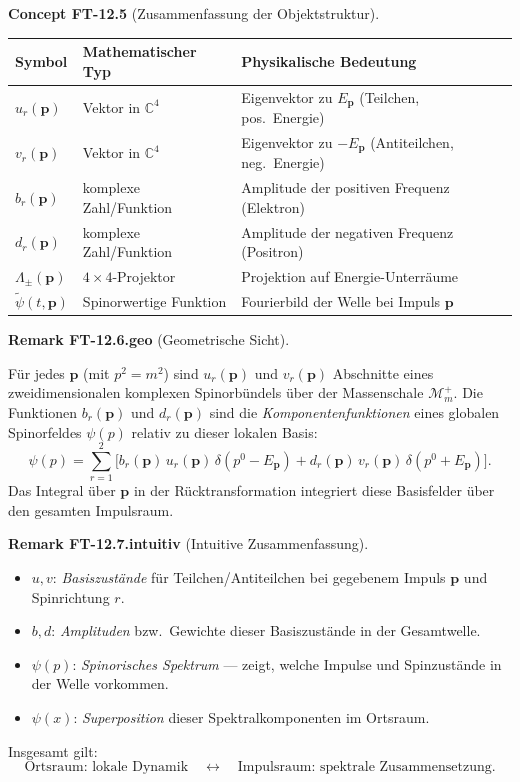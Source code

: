 \documentclass[10pt, letterpaper]{article}
\newcommand{\C}{\mathbb{C}}
\newcommand{\CustomHeading}[3]{%
  \par\medskip\noindent%
  \textbf{#1 #2} \textnormal{(#3)}.\enskip%
}
\newenvironment{REM}[2]{\begin{unitbox}\CustomHeading{Remark}{#1}{#2}}{\end{unitbox}}
\newenvironment{CONC}[2]{\begin{unitbox}\CustomHeading{Concept}{#1}{#2}}{\end{unitbox}}
\begin{document}
\begin{CONC}{FT-12.5}{Zusammenfassung der Objektstruktur}
\begin{center}
\begin{tabular}{lll}
\hline
Symbol & Mathematischer Typ & Physikalische Bedeutung\\
\hline
$u_r(\mathbf p)$ & Vektor in $\C^4$ & Eigenvektor zu $E_{\mathbf p}$ (Teilchen, pos.\ Energie)\\
$v_r(\mathbf p)$ & Vektor in $\C^4$ & Eigenvektor zu $-E_{\mathbf p}$ (Antiteilchen, neg.\ Energie)\\
$b_r(\mathbf p)$ & komplexe Zahl/Funktion & Amplitude der positiven Frequenz (Elektron)\\
$d_r(\mathbf p)$ & komplexe Zahl/Funktion & Amplitude der negativen Frequenz (Positron)\\
$\Lambda_\pm(\mathbf p)$ & $4\times4$-Projektor & Projektion auf Energie-Unterräume\\
$\tilde\psi(t,\mathbf p)$ & Spinorwertige Funktion & Fourierbild der Welle bei Impuls $\mathbf p$\\
\hline
\end{tabular}
\end{center}
\end{CONC}

\begin{REM}{FT-12.6.geo}{Geometrische Sicht}
Für jedes $\mathbf p$ (mit $p^2=m^2$) sind $u_r(\mathbf p)$ und $v_r(\mathbf p)$ Abschnitte eines zweidimensionalen komplexen Spinorbündels über der Massenschale $\mathcal M_m^+$.  
Die Funktionen $b_r(\mathbf p)$ und $d_r(\mathbf p)$ sind die \emph{Komponentenfunktionen} eines globalen Spinorfeldes $\psi(p)$ relativ zu dieser lokalen Basis:
\[
 \psi(p)=\sum_{r=1}^2 \Big[ b_r(\mathbf p)\,u_r(\mathbf p)\,\delta(p^0-E_{\mathbf p})
 + d_r(\mathbf p)\,v_r(\mathbf p)\,\delta(p^0+E_{\mathbf p})\Big].
\]
Das Integral über $\mathbf p$ in der Rücktransformation integriert diese Basisfelder über den gesamten Impulsraum.
\end{REM}

\begin{REM}{FT-12.7.intuitiv}{Intuitive Zusammenfassung}
\begin{itemize}
\item $u,v$: \emph{Basiszustände} für Teilchen/Antiteilchen bei gegebenem Impuls $\mathbf p$ und Spinrichtung $r$.
\item $b,d$: \emph{Amplituden} bzw.\ Gewichte dieser Basiszustände in der Gesamtwelle.
\item $\psi(p)$: \emph{Spinorisches Spektrum} — zeigt, welche Impulse und Spinzustände in der Welle vorkommen.
\item $\psi(x)$: \emph{Superposition} dieser Spektralkomponenten im Ortsraum.
\end{itemize}
Insgesamt gilt:
\[
 \text{Ortsraum: lokale Dynamik}\quad\leftrightarrow\quad
 \text{Impulsraum: spektrale Zusammensetzung}.
\]
\end{REM}
\end{document}

